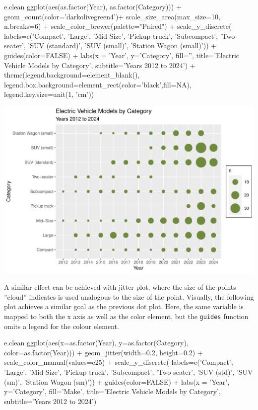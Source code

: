 \begin{samepage}
\begin{Rcode}
e.clean %
  ggplot(aes(as.factor(Year), as.factor(Category))) +
    geom_count(color='darkolivegreen4')+
    scale_size_area(max_size=10, n.breaks=6) + 
    scale_color_brewer(palette="Paired") +
    scale_y_discrete(
      labels=c('Compact', 'Large', 'Mid-Size', 'Pickup truck', 
               'Subcompact', 'Two-seater', 'SUV (standard)', 
               'SUV (small)', 'Station Wagon (small)')) + 
    guides(color=FALSE) +
    labs(x = 'Year',
         y='Category', 
         fill='', 
         title='Electric Vehicle Models by Category', 
         subtitle='Years 2012 to 2024') +
    theme(legend.background=element_blank(), 
          legend.box.background=element_rect(color='black',fill=NA),
          legend.key.size=unit(1, 'cm'))
\end{Rcode}
\end{samepage}

\begin{center}
  \includegraphics[width=.8\textwidth]{fuel.count.pdf}
\end{center}

A similar effect can be achieved with jitter plot, where the size of the points ''cloud'' indicates is used analogous to the size of the point. Visually, the following plot achieves a similar goal as the previous dot plot. Here, the same variable is mapped to both the x axis as well as the color element, but the \texttt{guides} function omits a legend for the colour element.

\begin{samepage}
\begin{Rcode}
e.clean %
  ggplot(aes(x=as.factor(Year), 
             y=as.factor(Category), 
             color=as.factor(Year))) +
    geom_jitter(width=0.2, height=0.2) +
    scale_color_manual(values=c25) +
    scale_y_discrete(
      labels=c('Compact', 'Large', 'Mid-Size', 
               'Pickup truck', 'Subcompact',
               'Two-seater', 'SUV (std)', 
               'SUV (sm)', 'Station Wagon (sm)')) + 
    guides(color=FALSE) +
    labs(x = 'Year', 
         y='Category', 
         fill='Make', 
         title='Electric Vehicle Models by Category', 
         subtitle='Years 2012 to 2024')
\end{Rcode}
\end{samepage}

